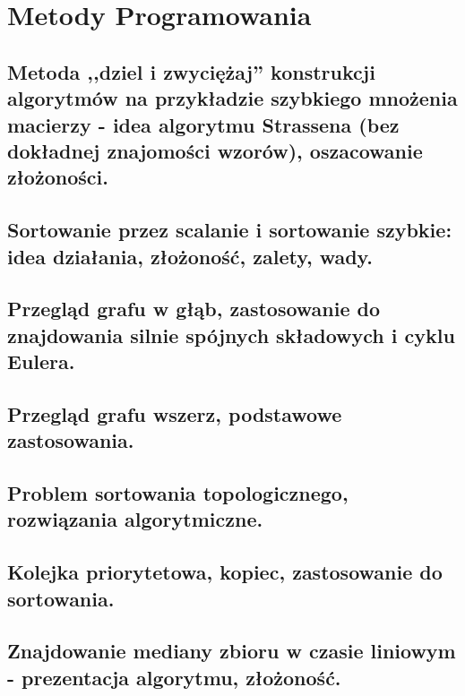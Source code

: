 \chapter{Metody Programowania}

\section{Metoda ,,dziel i zwyciężaj'' konstrukcji algorytmów na przykładzie szybkiego mnożenia macierzy - idea algorytmu Strassena (bez dokładnej znajomości wzorów), oszacowanie
złożoności.}


\section{Sortowanie przez scalanie i sortowanie szybkie: idea działania, złożoność, zalety, wady.}


\section{Przegląd grafu w głąb, zastosowanie do znajdowania silnie spójnych składowych i cyklu Eulera.}


\section{Przegląd grafu wszerz, podstawowe zastosowania.}


\section{Problem sortowania topologicznego, rozwiązania algorytmiczne.}


\section{Kolejka priorytetowa, kopiec, zastosowanie do sortowania.}


\section{Znajdowanie mediany zbioru w czasie liniowym - prezentacja algorytmu, złożoność.}
